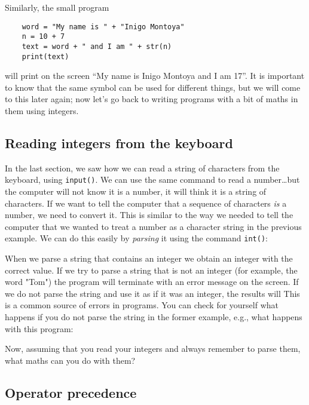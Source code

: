 Similarly, the small program

\begin{Verbatim}
    word = "My name is " + "Inigo Montoya"
    n = 10 + 7
    text = word + " and I am " + str(n)
    print(text)
\end{Verbatim}

will print on the screen ``My name is Inigo Montoya and I am 17''. It
is important to know that the same symbol can be used for different
things, but we will come to this later again; now let's go back to
writing programs with a bit of maths in them using integers.

\subsection{Reading integers from the keyboard}
\label{sec:intkeyboard}

In the last section, we saw how we can read a string of characters
from the keyboard, 
using \verb+input()+. We can use the same command
to read a number\ldots but the computer will not know it is a number,
it will think it is a string of characters. If we want to tell the
computer that a sequence of characters \emph{is} a number,
we need to convert it.
This is similar to the way we needed to tell the computer that we
wanted to treat a number as a character string in the previous example.
We can do this easily by \emph{parsing} it using the command
\verb+int()+: 


When we parse a string that contains an integer we obtain an integer
with the correct value. If we try to parse a string that is not an
integer (for example, the word "Tom") the program will terminate with an error
message on the screen. If we do not parse the string and use it as if
it was an integer, the results will
This
is a common source of errors in programs. You can check for yourself
what happens if you do not parse the string in the former example,
e.g., what happens with this program:


Now, assuming that you read your integers and always remember to parse
them, what maths can you do with them?

\subsection{Operator precedence}
\label{sec:prec}

